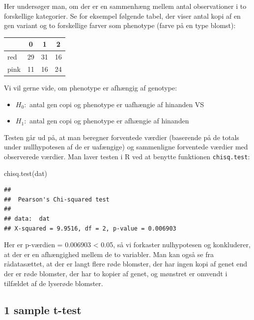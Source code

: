 \documentclass[
]{book}
\newenvironment{Shaded}{\begin{snugshade}}{\end{snugshade}}
\newcommand{\FunctionTok}[1]{\textcolor[rgb]{0.00,0.00,0.00}{#1}}
\newcommand{\NormalTok}[1]{#1}
\providecommand{\tightlist}{%
  \setlength{\itemsep}{0pt}\setlength{\parskip}{0pt}}
\begin{document}
Her undersøger man, om der er en sammenhæng mellem antal observationer i to forskellige kategorier. Se for eksempel følgende tabel, der viser antal kopi af en gen variant og to forskellige farver som phenotype (farve på en type blomst):

\begin{longtable}[]{@{}lccc@{}}
\toprule
& 0 & 1 & 2 \\
\midrule
\endhead
red & 29 & 31 & 16 \\
pink & 11 & 16 & 24 \\
\bottomrule
\end{longtable}

Vi vil gerne vide, om phenotype er afhængig af genotype:

\begin{itemize}
\tightlist
\item
  \(H_{0}:\) antal gen copi og phenotype er uafhængie af hinanden VS
\item
  \(H_{1}:\) antal gen copi og phenotype er afhængie af hinanden
\end{itemize}

Testen går ud på, at man beregner forventede værdier (baserende på de totals under nullhypotesen af de er uafængige) og sammenligne forventede værdier med observerede værdier. Man laver testen i R ved at benytte funktionen \texttt{chisq.test}:

\begin{Shaded}
\begin{Highlighting}[]
\FunctionTok{chisq.test}\NormalTok{(dat)}
\end{Highlighting}
\end{Shaded}

\begin{verbatim}
## 
##  Pearson's Chi-squared test
## 
## data:  dat
## X-squared = 9.9516, df = 2, p-value = 0.006903
\end{verbatim}

Her er p-værdien = 0.006903 \textless{} 0.05, så vi forkaster nulhypotesen og konkluderer, at der er en afhængighed mellem de to variabler. Man kan også se fra rådatasættet, at der er langt flere røde blomster, der har ingen kopi af genet end der er røde blomster, der har to kopier af genet, og mønstret er omvendt i tilfældet af de lyserøde blomster.

\hypertarget{sample-t-test}{%
\subsection{1 sample t-test}\label{sample-t-test}}
\end{document}
